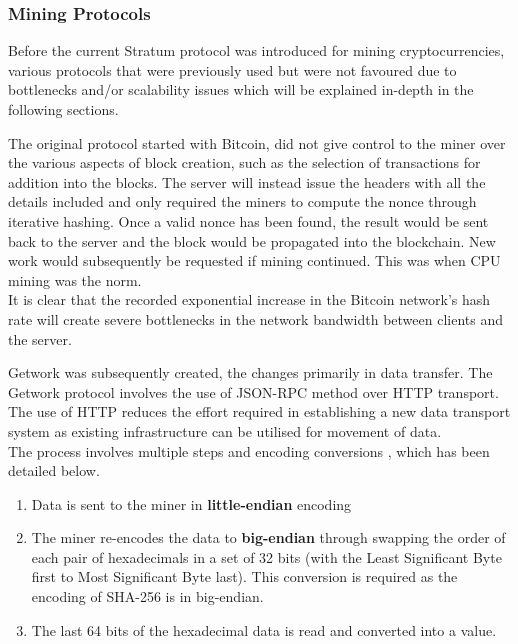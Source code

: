 \documentclass[a4paper,12pt]{article}
\newcounter{subsubsubsection}[subsubsection]
\begin{document}
{ \subsubsection{Mining Protocols}
 {Before the current Stratum protocol was introduced for mining cryptocurrencies, various protocols that were previously used but were not favoured due to bottlenecks and/or scalability issues which will be explained in-depth in the following sections.}
 {\par The original protocol started with Bitcoin, did not give control to the miner over the various aspects of block creation, such as the selection of transactions for addition into the blocks. The server will instead issue the headers with all the details included and only required the miners to compute the nonce through iterative hashing. Once a valid nonce has been found, the result would be sent back to the server and the block would be propagated into the blockchain. New work would subsequently be requested if mining continued. This was when \ac{CPU} mining was the norm.\\\newline
 	It is clear that the recorded exponential increase in the Bitcoin network's hash rate \cite{bchashrate} will create severe bottlenecks in the network bandwidth between clients and the server.
 	{\par \noindent Getwork was subsequently created, the changes primarily in data transfer. The Getwork protocol involves the use of JSON-\ac{RPC} method over HTTP transport. The use of HTTP reduces the effort required in establishing a new data transport system as existing infrastructure can be utilised for movement of data.\\\newline
 	The process involves multiple steps and encoding conversions \cite{getwork}, which has been detailed below.
 \begin{enumerate}
 	\item Data is sent to the miner in \textbf{little-endian} encoding
 	\item The miner re-encodes the data to \textbf{big-endian} through swapping the order of each pair of hexadecimals in a set of 32 bits (with the Least Significant Byte first to Most Significant Byte last). This conversion is required as the encoding of \textsc{SHA-256} is in big-endian.
 	\item The last 64 bits of the hexadecimal data is read and converted into a value.

\end{enumerate}}}}
\end{document}
